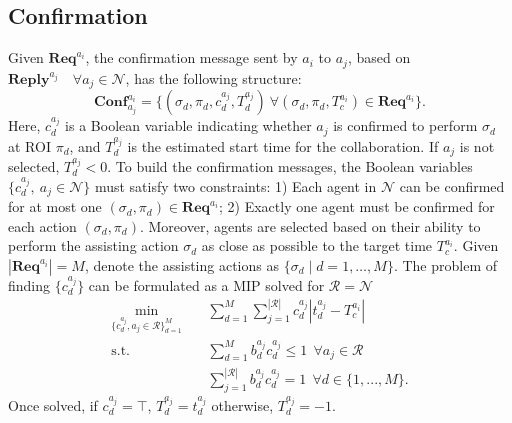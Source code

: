 \subsection{Confirmation}\label{subsec:res-confirm}
 Given $\mathbf{Req}^{a_i}$, the confirmation message sent by  $a_i$ to $a_j$, based on $\mathbf{Reply}^{a_j} \quad \forall a_j \in \mathcal{N}$, has the following structure:
\begin{equation*}
          \mathbf{Conf}^{a_i}_{a_j}=\{(\sigma_d, \pi_d, c^{a_j}_{d},  T^{a_j}_d)\ \forall (\sigma_d, \pi_d, T^{a_i}_c)\in \mathbf{Req}^{a_i}\}. 
\end{equation*}
Here, $c^{a_j}_{d}$ is a Boolean variable indicating whether $a_j$ is confirmed to perform $\sigma_d$ at ROI $\pi_d$, and $T^{a_j}_d$ is the estimated start time for the collaboration. If $a_j$ is not selected, $T^{a_j}_d < 0$.
To build the confirmation messages, the Boolean variables $\{c^{a_j}_{d},\ a_j \in \mathcal{N}\}$ must satisfy two constraints: 1) Each agent in $\mathcal{N}$ can be confirmed for at most one $(\sigma_d, \pi_d) \in \mathbf{Req}^{a_i}$; 2) Exactly one agent must be confirmed for each action $(\sigma_d, \pi_d)$. Moreover, agents are selected based on their ability to perform the assisting action $\sigma_d$ as close as possible to the target time $T^{a_i}_c$.
Given $ |\mathbf{Req}^{a_i}| = M $, denote the assisting actions as $\{\sigma_d \mid d=1,\ldots, M\}$. The problem of finding $\{c^{a_j}_d\}$ can be formulated as a MIP solved for $\mathcal{R}=\mathcal{N}$
\begin{subequations}\label{eq:MIP}
    \begin{align}
        \min\limits_{\{c^{a_j}_d , a_j\in\mathcal{R}\}_{d=1}^M} &\quad \sum^{M}_{d=1}\sum^{|\mathcal{R}|}_{j=1}c^{a_j}_{d} | t^{a_j}_d-T^{a_i}_c| \label{eq:mip-cost}\\
        \text{s.t.}\ &\quad \sum^{M}_{d=1} b^{a_j}_{d}  c^{a_j}_{d}\leq1\ \ \forall a_j\in  \mathcal{R}\label{eq:mip-constr1}\\
         &\quad \sum^{ |\mathcal{R}|}_{j=1} b^{a_j}_{d} c^{a_j}_{d}=1\ \ \forall d\in \{1,...,M\}.  \label{eq:mip-constr2} 
    \end{align}
\end{subequations}
Once solved, if $c^{a_j}_d = \top$, $T^{a_j}_d = t^{a_j}_d$ otherwise, $T^{a_j}_d = -1$.
\begin{comment}
\begin{remark}\label{rmk:necessary_condition_MIP}
    A necessary condition for feasibility is $N > M$, since each action requires a distinct agent. Additionally, agent $a_i$ cannot be assigned to any actions, as its reply will have $b^{a_i}_d = \bot \ \forall \sigma_d$.
\end{remark}
\begin{remark}\label{rmk:feasibility_MIP}
    To ensure feasibility, there must exist a subset $\mathcal{N}_H \subseteq \mathcal{N}$ such that $ |\mathcal{N}_H| = M $; each agent can assist with at least one action and, there exists a combination of these agents such that we can assign to each of them exactly one action, with no overlap.
\end{remark}
\end{comment}
